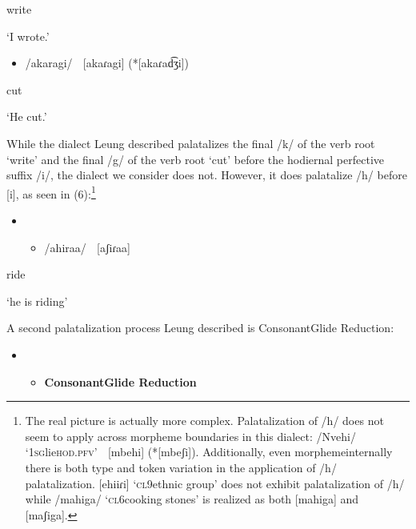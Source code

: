 \documentclass[output=paper]{langsci/langscibook}
\begin{document}
write

‘I wrote.’

\begin{itemize}
\item /akaragi/    \textsc{[}akaɾagi]  (*[akaɾad͡ʒi])

\end{itemize}

cut

\textsc{‘}He cut.’

While the dialect Leung described palatalizes the final /k/ of the verb root ‘write’ and the final /g/ of the verb root ‘cut’ before the hodiernal perfective suffix /i/, the dialect we consider does not. However, it does palatalize /h/ before [i], as seen in (6):\footnote{   The real picture is actually more complex. Palatalization of /h/ does not seem to apply across morpheme boundaries in this dialect: /Nvehi/ ‘1\textsc{sg}lie\textsc{hod.pfv}’  [mbehi] (*[mbeʃi]). Additionally, even morphemeinternally there is both type and token variation in the application of /h/ palatalization. [ehiiɾi] ‘\textsc{cl}9ethnic group’ does not exhibit palatalization of /h/ while /mahiga/ ‘\textsc{cl}6cooking stones’ is realized as both [mahiga] and [maʃiga]. }

\setcounter{itemize}{0}
\begin{itemize}
\item \setcounter{itemize}{0}
\begin{itemize}
\item /ahiraa/    [aʃiɾaa]

\end{itemize}
\end{itemize}

ride

‘he is riding’

A second palatalization process Leung described is ConsonantGlide Reduction:

\begin{itemize}
\item \setcounter{itemize}{0}
\begin{itemize}
\item \textbf{Consonant}\textbf{Glide Reduction }\citep[116]{Leung1991}

\end{itemize}
\end{itemize}
\end{document}
